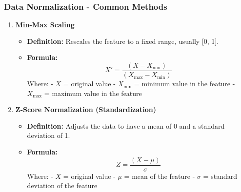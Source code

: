 \documentclass{beamer}
\begin{document}
\begin{frame}[fragile]
    \frametitle{Data Normalization - Common Methods}
    \begin{enumerate}
        \item \textbf{Min-Max Scaling}
        \begin{itemize}
            \item \textbf{Definition:} Rescales the feature to a fixed range, usually [0, 1].
            \item \textbf{Formula:} 
            \begin{equation}
            X' = \frac{(X - X_{\text{min}})}{(X_{\text{max}} - X_{\text{min}})}
            \end{equation}
            Where:
            - \(X\) = original value
            - \(X_{\text{min}}\) = minimum value in the feature
            - \(X_{\text{max}}\) = maximum value in the feature
        \end{itemize}
        \item \textbf{Z-Score Normalization (Standardization)}
        \begin{itemize}
            \item \textbf{Definition:} Adjusts the data to have a mean of 0 and a standard deviation of 1.
            \item \textbf{Formula:} 
            \begin{equation}
            Z = \frac{(X - \mu)}{\sigma}
            \end{equation}
            Where:
            - \(X\) = original value
            - \(\mu\) = mean of the feature
            - \(\sigma\) = standard deviation of the feature
        \end{itemize}
    \end{enumerate}
\end{frame}
\end{document}
